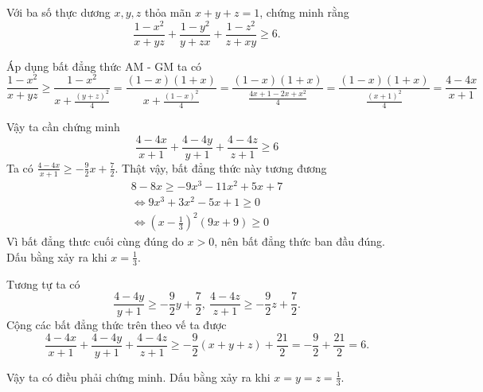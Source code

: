 \begin{problem}
Với ba số thực dương $x, y, z$ thỏa mãn $x + y + z = 1$, chứng minh rằng
\[
	\frac{1 - x^2}{x + yz} + \frac{1 - y^2}{y + zx} + \frac{1 - z^2}{z + xy} \ge 6.
\]

\solution

Áp dụng bất đẳng thức AM - GM ta có
\[
	\frac{1 - x^2}{x + yz} \ge \frac{1 - x^2}{\displaystyle x + \frac{(y + z)^2}{4}} 
	= \frac{(1 - x)(1 + x)}{\displaystyle x + \frac{(1 - x)^2}{4}} = \frac{(1-x)(1+x)}{\displaystyle \frac{4x + 1 - 2x + x^2}{4}}
	= \frac{(1-x)(1+x)}{\displaystyle \frac{(x + 1)^2}{4}} = \frac{4-4x}{x + 1}
\]

Vậy ta cần chứng minh
\[
	\frac{4-4x}{x + 1} + \frac{4-4y}{y + 1} + \frac{4-4z}{z + 1} \ge 6
\]
Ta có $\displaystyle \frac{4 - 4x}{x + 1} \ge -\frac{9}{2}x + \frac{7}{2}$. Thật vậy, bất đẳng thức này tương đương
\begin{align*}
8 - 8x \ge -9x^3 - 11x^2 + 5x + 7 \\
\Leftrightarrow 9x^3 + 3x^2 - 5x + 1 \ge 0 \\
\Leftrightarrow \left(x - \frac{1}{3}\right)^2(9x + 9) \ge 0
\end{align*}
Vì bất đẳng thưc cuối cùng đúng do $x > 0$, nên bất đẳng thức ban đầu đúng. Dấu bằng xảy ra khi $\displaystyle x = \frac{1}{3}$.

Tương tự ta có
\[
	\frac{4 - 4y}{y + 1} \ge -\frac{9}{2}y + \frac{7}{2},\ \frac{4 - 4z}{z + 1} \ge -\frac{9}{2}z + \frac{7}{2}.
\]
Cộng các bất đẳng thức trên theo vế ta được
\[
	\frac{4 - 4x}{x + 1} + \frac{4 - 4y}{y + 1} + \frac{4 - 4z}{z + 1} \ge -\frac{9}{2}(x + y + z) + \frac{21}{2} = -\frac{9}{2} + \frac{21}{2} = 6.
\]

Vậy ta có điều phải chứng minh. Dấu bằng xảy ra khi $\displaystyle x = y = z = \frac{1}{3}$.

\end{problem}